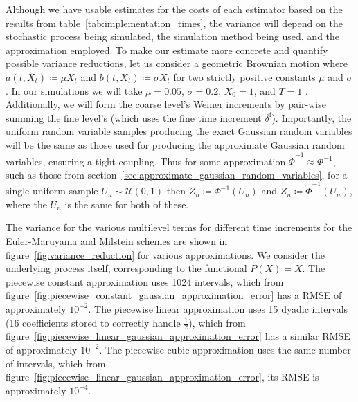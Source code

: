\documentclass[manuscript,review]{acmart}
\begin{document}
Although we have usable estimates for the costs of each estimator based on the results from table~\ref{tab:implementation_times}, the variance will depend on the stochastic process being simulated, the simulation method being used, and the approximation employed. To make our estimate more concrete and quantify possible variance reductions, let us consider a geometric Brownian motion where $ a(t, X_t) \coloneqq \mu X_t $ and $ b(t, X_t) \coloneqq \sigma X_t $ for two strictly positive constants $ \mu $ and $ \sigma $. In our simulations we will take $ \mu = 0.05 $, $ \sigma = 0.2 $, $ X_0 = 1 $, and $ T = 1 $ \citep[6.1]{giles2008multilevel}. Additionally, we will form the coarse level's Weiner increments by pair-wise summing the fine level's (which uses the fine time increment $ \delta^{\mathrm{f}} $). Importantly, the uniform random variable samples producing the exact Gaussian random variables will be the same as those used for producing the approximate Gaussian random variables, ensuring a tight coupling. Thus for some approximation $ \tilde{\Phi}^{-1} \approx \Phi^{-1} $, such as those from section~\ref{sec:approximate_gaussian_random_variables}, for a single uniform sample $ U_n \sim \mathcal{U}(0, 1) $ then $ Z_n \coloneqq \Phi^{-1}(U_n) $ and $ \tilde{Z}_n \coloneqq \tilde{\Phi}^{-1}(U_n) $, where the $ U_n $ is the same for both of these.

The variance for the various multilevel terms for different time increments for the Euler-Maruyama and Milstein schemes are shown in figure~\ref{fig:variance_reduction} for various approximations. We consider the underlying process itself, corresponding to the functional $ P(X) = X $. The piecewise constant approximation uses 1024 intervals, which from figure~\ref{fig:piecewise_constant_gaussian_approximation_error} has a RMSE of approximately $ 10^{-2} $. The piecewise linear approximation uses 15 dyadic intervals (16 coefficients stored to correctly handle $ \tfrac{1}{2} $), which from figure~\ref{fig:piecewise_linear_gaussian_approximation_error} has a similar RMSE of approximately $ 10^{-2} $. The piecewise cubic approximation uses the same number of intervals, which from figure~\ref{fig:piecewise_linear_gaussian_approximation_error}, its RMSE is approximately $ 10^{-4} $.
\end{document}
